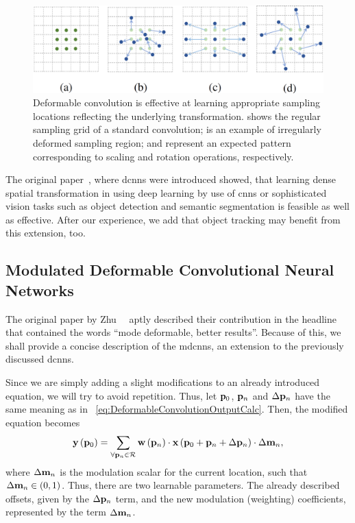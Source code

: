 \begin{figure}[t]
    \centerline{\includegraphics[width=0.7\linewidth]{figures/siamese_tracking/dcn_sampling_locations.png}}
    \caption[Various sampling locations in \glspl{dcnn}]{Deformable convolution is effective at learning appropriate sampling locations reflecting the underlying transformation.  shows the regular sampling grid of a standard convolution;  is an example of irregularly deformed sampling region;  and  represent an expected pattern corresponding to scaling and rotation operations, respectively. }
    \label{fig:SamplingLocationsDeformableCNN}
\end{figure}

The original paper~\cite{dai2017dcnn}, where \glspl{dcnn} were introduced showed, that learning dense spatial transformation in using deep learning by use of \glspl{cnn} or sophisticated vision tasks such as object detection and semantic segmentation is feasible as well as effective. After our experience, we add that object tracking may benefit from this extension, too.

\subsection{Modulated Deformable Convolutional Neural Networks}
\label{ssec:ModulatedDeformableCNNs}

The original paper by Zhu~\etal{}~\cite{zhu2018mdcnn} aptly described their contribution in the headline that contained the words ``mode deformable, better results''. Because of this, we shall provide a concise description of the \glspl{mdcnn}, an extension to the previously discussed \glspl{dcnn}.

Since we are simply adding a slight modifications to an already introduced equation, we will try to avoid repetition. Thus, let $\mathbf{p}_0$, $\mathbf{p}_n$ and $\Delta \mathbf{p}_n$ have the same meaning as in \eqtext{}~\ref{eq:DeformableConvolutionOutputCalc}. Then, the modified equation becomes
\begin{equation}
    \label{eq:ModulatedDeformableConvolutionOutputCalc}
    {\mathbf{y}} \left( \mathbf{p}_0 \right) =
    \sum_{\forall \mathbf{p}_n \in \mathcal{R}}
    {\mathbf{w}} \left( \mathbf{p}_n \right) \cdot {\mathbf{x}} \left( \mathbf{p}_0 + \mathbf{p}_n + \Delta \mathbf{p}_n \right) \cdot \Delta \mathbf{m}_n,
\end{equation}
where $\Delta \mathbf{m}_n$ is the modulation scalar for the current location, such that $\Delta \mathbf{m}_n \in \left( {0, 1} \right)$. Thus, there are two learnable parameters. The already described offsets, given by the $\Delta \mathbf{p}_n$ term, and the new modulation (weighting) coefficients, represented by the term $\Delta \mathbf{m}_n$.

